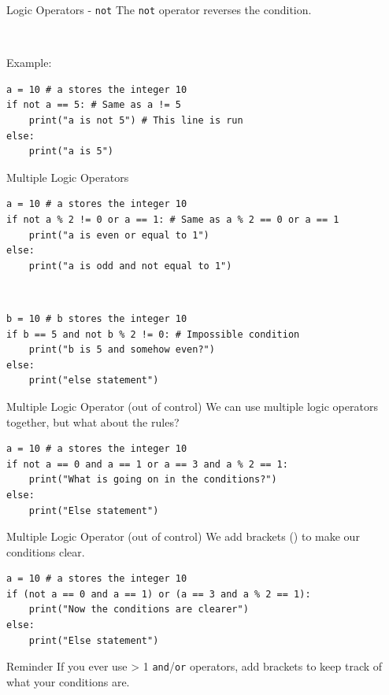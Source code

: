 \documentclass[dvipsnames, svgnames, x11names, handout]{beamer}
\begin{document}
\begin{frame}[fragile]{Logic Operators - \texttt{not}}
The \texttt{not} operator reverses the condition.

\

Example:
\begin{verbatim}
a = 10 # a stores the integer 10
if not a == 5: # Same as a != 5
	print("a is not 5") # This line is run
else:
	print("a is 5")
\end{verbatim}
\end{frame}

\begin{frame}[fragile]{Multiple Logic Operators}
\begin{verbatim}
a = 10 # a stores the integer 10
if not a % 2 != 0 or a == 1: # Same as a % 2 == 0 or a == 1
	print("a is even or equal to 1")
else:
	print("a is odd and not equal to 1")
\end{verbatim}

\

\begin{verbatim}
b = 10 # b stores the integer 10
if b == 5 and not b % 2 != 0: # Impossible condition
	print("b is 5 and somehow even?")
else:
	print("else statement")
\end{verbatim}
\end{frame}

\begin{frame}[fragile]{Multiple Logic Operator (out of control)}
We can use multiple logic operators together, but what about the rules?
\begin{verbatim}
a = 10 # a stores the integer 10
if not a == 0 and a == 1 or a == 3 and a % 2 == 1:
	print("What is going on in the conditions?")
else:
	print("Else statement")
\end{verbatim}
\end{frame}

\begin{frame}[fragile]{Multiple Logic Operator (out of control)}
We add brackets () to make our conditions clear.
\begin{verbatim}
a = 10 # a stores the integer 10
if (not a == 0 and a == 1) or (a == 3 and a % 2 == 1):
	print("Now the conditions are clearer")
else:
	print("Else statement")
\end{verbatim}
\pause
\begin{block}{Reminder}
If you ever use > 1 \texttt{and}/\texttt{or} operators, add brackets to keep track of what your conditions are.
\end{block}
\end{frame}
\end{document}
